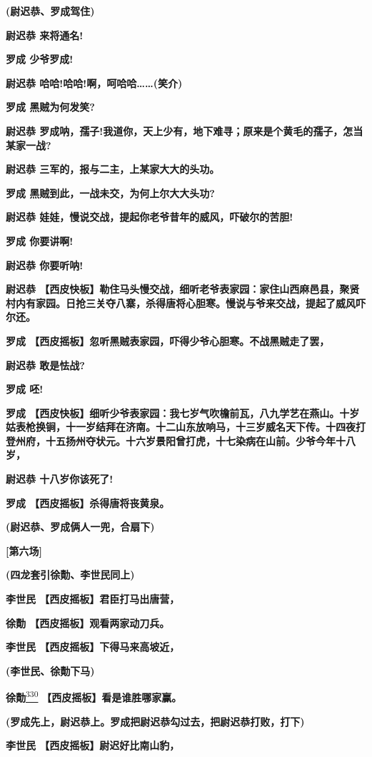 \textbf{(尉迟恭、罗成驾住)}

\textbf{尉迟恭 来将通名!}

\textbf{罗成 少爷罗成!}

\textbf{尉迟恭 哈哈!哈哈!啊，呵哈哈\ldots{}\ldots{}(笑介)}

\textbf{罗成 黑贼为何发笑?}

\textbf{尉迟恭
罗成呐，孺子!我道你，天上少有，地下难寻；原来是个黄毛的孺子，怎当某家一战?}

\textbf{尉迟恭 三军的，报与二主，上某家大大的头功。}

\textbf{罗成 黑贼到此，一战未交，为何上尔大大头功?}

\textbf{尉迟恭 娃娃，慢说交战，提起你老爷昔年的威风，吓破尔的苦胆!}

\textbf{罗成 你要讲啊!}

\textbf{尉迟恭 你要听呐!}

\textbf{尉迟恭
【西皮快板】勒住马头慢交战，细听老爷表家园：家住山西麻邑县，聚贤村内有家园。日抢三关夺八寨，杀得唐将心胆寒。慢说与爷来交战，提起了威风吓尔还。}

\textbf{罗成
【西皮摇板】忽听黑贼表家园，吓得少爷心胆寒。不战黑贼走了罢，}

\textbf{尉迟恭 敢是怯战?}

\textbf{罗成 呸!}

\textbf{罗成
【西皮快板】细听少爷表家园：我七岁气吹檐前瓦，八九学艺在燕山。十岁姑表枪换锏，十一岁结拜在济南。十二山东放响马，十三岁威名天下传。十四夜打登州府，十五扬州夺状元。十六岁景阳曾打虎，十七染病在山前。少爷今年十八岁，}

\textbf{尉迟恭 十八岁你该死了!}

\textbf{罗成 【西皮摇板】杀得唐将丧黄泉。}

\textbf{(尉迟恭、罗成俩人一兜，合扇下)}

\textbf{{[}第六场{]}}

\textbf{(四龙套引徐勣、李世民同上)}

\textbf{李世民 【西皮摇板】君臣打马出唐营，}

\textbf{徐勣 【西皮摇板】观看两家动刀兵。}

\textbf{李世民 【西皮摇板】下得马来高坡近，}

\textbf{(李世民、徐勣下马)}

\textbf{徐勣}\protect\hyperlink{fn330}{\textsuperscript{330}}
\textbf{【西皮摇板】看是谁胜哪家赢。}

\textbf{(罗成先上，尉迟恭上。罗成把尉迟恭勾过去，把尉迟恭打败，打下)}

\textbf{李世民 【西皮摇板】尉迟好比南山豹，}


